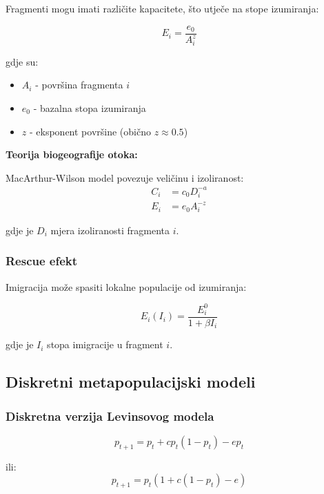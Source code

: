 \documentclass[11pt,oneside]{book}
\begin{document}
Fragmenti mogu imati različite kapacitete, što utječe na stope izumiranja:

\begin{equation}
	E_i = \frac{e_0}{A_i^z}
\end{equation}

gdje su:
\begin{itemize}
	\item $A_i$ - površina fragmenta $i$
	\item $e_0$ - bazalna stopa izumiranja
	\item $z$ - eksponent površine (obično $z \approx 0.5$)
\end{itemize}

\textbf{Teorija biogeografije otoka:}

MacArthur-Wilson model povezuje veličinu i izoliranost:
\begin{align}
	C_i &= c_0 D_i^{-a} \\
	E_i &= e_0 A_i^{-z}
\end{align}

gdje je $D_i$ mjera izoliranosti fragmenta $i$.

\subsubsection{Rescue efekt}

Imigracija može spasiti lokalne populacije od izumiranja:

\begin{equation}
	E_i(I_i) = \frac{E_i^0}{1 + \beta I_i}
\end{equation}

gdje je $I_i$ stopa imigracije u fragment $i$.

\subsection{Diskretni metapopulacijski modeli}

\subsubsection{Diskretna verzija Levinsovog modela}

\begin{equation}
	p_{t+1} = p_t + cp_t(1-p_t) - ep_t
\end{equation}

ili:
\begin{equation}
	p_{t+1} = p_t(1 + c(1-p_t) - e)
\end{equation}
\end{document}
